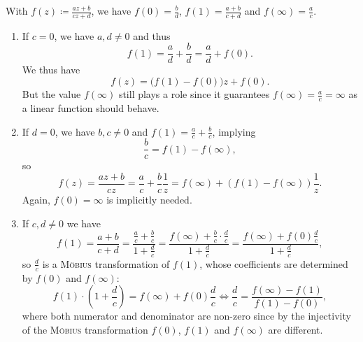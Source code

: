 \documentclass[a4paper,english]{article}
\begin{document}
\begin{pr}
    With $f(z) \coloneqq \frac{a z + b}{c z + d}$, we have $f(0) = \frac{b}{d}$, $f(1) = \frac{a + b}{c + d}$ and $f(\infty) = \frac{a}{c}$.
    \begin{enumerate}
        \item 
        If $c = 0$, we have $a,d \ne 0$ and thus
        \begin{equation*}
            f(1)
            = \frac{a}{d} + \frac{b}{d}
            = \frac{a}{d} + f(0).
        \end{equation*}
        We thus have
        \begin{equation*}
            f(z)
            = \big(f(1) - f(0)\big) z + f(0).
        \end{equation*}
        But the value $f(\infty)$ still plays a role since it guarantees $f(\infty) = \frac{a}{c} = \infty$ as a linear function should behave.
        
        \item
        If $d = 0$, we have $b, c \ne 0$ and $f(1) = \frac{a}{c} + \frac{b}{c}$, implying
        \begin{equation*}
            \frac{b}{c}
            = f(1) - f(\infty),
        \end{equation*}
        so
        \begin{equation*}
            f(z)
            = \frac{a z + b}{c z} = \frac{a}{c} + \frac{b}{c} \frac{1}{z}
            = f(\infty) + (f(1) - f(\infty)) \frac{1}{z}.
        \end{equation*}
        Again, $f(0) = \infty$ is implicitly needed.
        
        \item
        If $c, d \ne 0$ we have
        \begin{equation*}
            f(1)
            = \frac{a + b}{c + d}
            = \frac{\frac{a}{c} + \frac{b}{c}}{1 + \frac{d}{c}}
            = \frac{f(\infty) + \frac{b}{c} \cdot \frac{d}{c}}{1 + \frac{d}{c}}
            = \frac{f(\infty) + f(0) \frac{d}{c}}{1 + \frac{d}{c}},
        \end{equation*}
        so $\frac{d}{c}$ is a \textsc{Möbius} transformation of $f(1)$, whose coefficients are determined by $f(0)$ and $f(\infty)$:
        \begin{equation*}
            f(1) \cdot \left(1 + \frac{d}{c}\right)
            = f(\infty) + f(0) \frac{d}{c}
            \iff \frac{d}{c}
            = \frac{f(\infty) - f(1)}{f(1) - f(0)},
        \end{equation*}
        where both numerator and denominator are non-zero since by the injectivity of the \textsc{Möbius} transformation $f(0)$, $f(1)$ and $f(\infty)$ are different.
        

\end{enumerate}
\end{pr}
\end{document}
